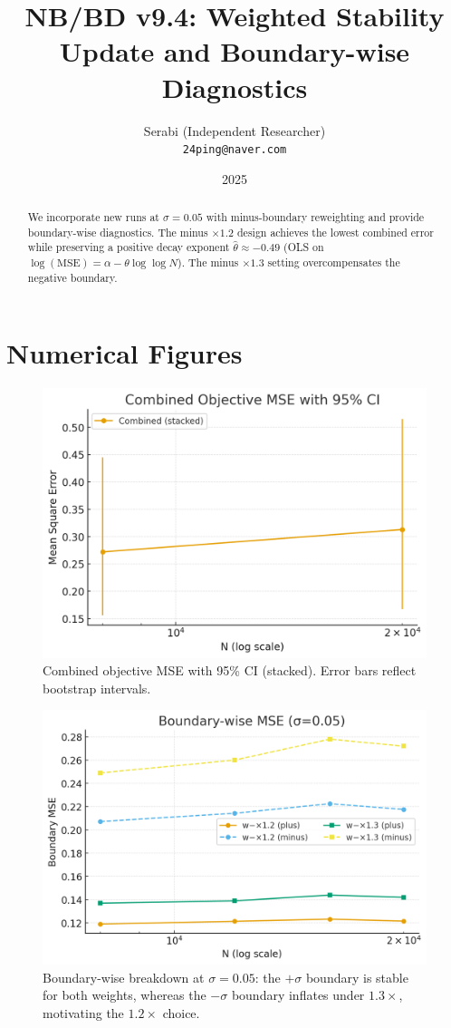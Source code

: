\documentclass[11pt]{article}
\title{NB/BD v9.4: Weighted Stability Update and Boundary-wise Diagnostics}
\author{Serabi (Independent Researcher)\\ \texttt{24ping@naver.com}}
\date{2025}
\theoremstyle{remark}
\begin{document}
\maketitle

\begin{abstract}
We incorporate new runs at $\sigma=0.05$ with minus-boundary reweighting and provide boundary-wise diagnostics.
The minus $\times 1.2$ design achieves the lowest combined error while preserving a positive decay exponent $\hat\theta\approx -0.49$ (OLS on $\log(\mathrm{MSE})=\alpha-\theta \log\log N$). The minus $\times 1.3$ setting overcompensates the negative boundary.
\end{abstract}

\section*{Numerical Figures}

\begin{figure}[h]
\centering
\includegraphics[width=.82\linewidth]{figures/combined_ci.png}
\caption{Combined objective MSE with 95\% CI (stacked). Error bars reflect bootstrap intervals.}
\end{figure}

\begin{figure}[h]
\centering
\includegraphics[width=.82\linewidth]{figures/boundary_w12_w13.png}
\caption{Boundary-wise breakdown at $\sigma=0.05$: the $+\sigma$ boundary is stable for both weights, whereas the $-\sigma$ boundary inflates under $1.3\times$, motivating the $1.2\times$ choice.}
\end{figure}
\end{document}

